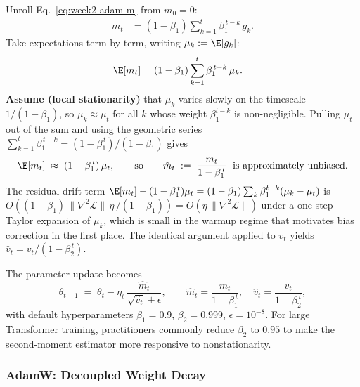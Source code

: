 \begin{derivation}
Unroll Eq.~\eqref{eq:week2-adam-m} from $m_0 = 0$:
\begin{align*}
m_t &= (1-\beta_1) \sum_{k=1}^{t} \beta_1^{\,t-k}\, g_k.
\end{align*}
Take expectations term by term, writing $\mu_k := \E[g_k]$:
\begin{align*}
\E[m_t]
  &= (1-\beta_1) \sum_{k=1}^{t} \beta_1^{\,t-k}\,\mu_k.
\end{align*}
\textbf{Assume (local stationarity)} that $\mu_k$ varies slowly on the
timescale $1/(1-\beta_1)$, so $\mu_k \approx \mu_t$ for all $k$ whose
weight $\beta_1^{t-k}$ is non-negligible. Pulling $\mu_t$ out of the
sum and using the geometric series
$\sum_{k=1}^{t}\beta_1^{\,t-k} = (1-\beta_1^{\,t})/(1-\beta_1)$ gives
\begin{align*}
\E[m_t] \;\approx\; (1-\beta_1^{\,t})\,\mu_t,
\qquad
\text{so}\qquad
\hat m_t \;:=\; \frac{m_t}{1-\beta_1^{\,t}} \;\text{ is approximately unbiased}.
\end{align*}
The residual drift term $\E[m_t] - (1-\beta_1^{\,t})\mu_t
= (1-\beta_1)\sum_k \beta_1^{t-k}(\mu_k - \mu_t)$ is
$O\!\left((1-\beta_1)\,\|\nabla^{2}\!\mathcal{L}\|\,\eta\,/(1-\beta_1)\right)
= O(\eta\,\|\nabla^{2}\!\mathcal{L}\|)$ under a one-step Taylor
expansion of $\mu_k$, which is small in the warmup regime that motivates
bias correction in the first place. The identical argument applied to
$v_t$ yields $\hat v_t = v_t/(1-\beta_2^{\,t})$.
\end{derivation}

The parameter update becomes
\begin{equation}
\label{eq:week2-adam-update}
\theta_{t+1} \;=\; \theta_t - \eta_t\,\frac{\hat m_t}{\sqrt{\hat v_t} + \epsilon},
\qquad
\hat m_t = \frac{m_t}{1-\beta_1^{\,t}},
\quad
\hat v_t = \frac{v_t}{1-\beta_2^{\,t}},
\end{equation}
with default hyperparameters $\beta_1 = 0.9$, $\beta_2 = 0.999$,
$\epsilon = 10^{-8}$. For large Transformer training, practitioners
commonly reduce $\beta_2$ to $0.95$ to make the second-moment estimator
more responsive to nonstationarity.

\subsubsection{AdamW: Decoupled Weight Decay}

